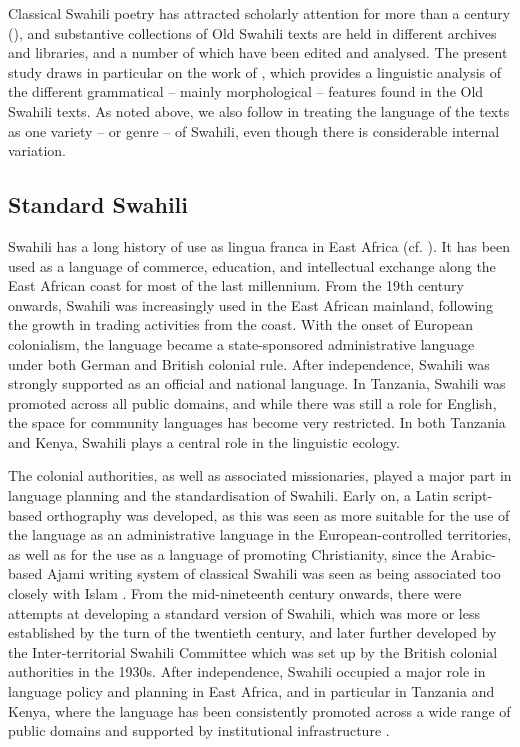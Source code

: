\documentclass[output=paper]{langscibook}
\begin{document}
Classical Swahili poetry has attracted scholarly attention for more than a century (\citealt{Taylor1891, Harries1962, Miehe1979, MulukoziSengo1995, Bertoncini1998, Vierke2011}), and substantive collections of Old Swahili texts are held in different archives and libraries, and a number of which have been edited and analysed. The present study draws in particular on the work of \citet{Miehe1979}, which provides a linguistic analysis of the different grammatical -- mainly morphological -- features found in the Old Swahili texts. As noted above, we also follow \citet{Miehe1979} in treating the language of the texts as one variety -- or genre -- of Swahili, even though there is considerable internal variation. 

\subsection{Standard Swahili}\label{sec:marten:2.3}

Swahili has a long history of use as lingua franca in East Africa (cf. \citealt{Whiteley1969, Mbaabu1978, Blommaert2014, Mugane2015}). It has been used as a language of commerce, education, and intellectual exchange along the East African coast for most of the last millennium. From the 19th century onwards, Swahili was increasingly used in the East African mainland, following the growth in trading activities from the coast. With the onset of European colonialism, the language became a state-sponsored administrative language under both German and British colonial rule. After independence, Swahili was strongly supported as an official and national language. In Tanzania, Swahili was promoted across all public domains, and while there was still a role for English, the space for community languages has become very restricted. In both Tanzania and Kenya, Swahili plays a central role in the linguistic ecology. 

The colonial authorities, as well as associated missionaries, played a major part in language planning and the standardisation of Swahili. Early on, a Latin script-based orthography was developed, as this was seen as more suitable for the use of the language as an administrative language in the European-controlled territories, as well as for the use as a language of promoting Christianity, since the Arabic-based Ajami writing system of classical Swahili was seen as being associated too closely with Islam \citep{Whiteley1969}. From the mid-nineteenth century onwards, there were attempts at developing a standard version of Swahili, which was more or less established by the turn of the twentieth century, and later further developed by the Inter-territorial Swahili Committee which was set up by the British colonial authorities in the 1930s. After independence, Swahili occupied a major role in language policy and planning in East Africa, and in particular in Tanzania and Kenya, where the language has been consistently promoted across a wide range of public domains and supported by institutional infrastructure \citep{Mugane2015}. 
\end{document}
